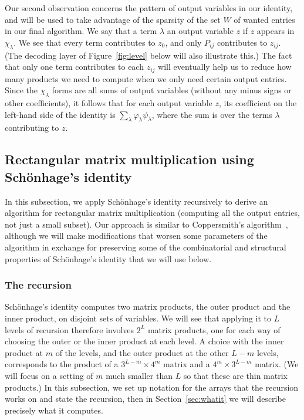 Our second observation concerns the pattern of output variables in our identity, and will be used to take advantage of the sparsity of the set $W$ of wanted entries in our final algorithm. 
We say that a term $\lambda$  an output variable $z$ if $z$ appears in $\chi_\lambda$. We see that every term contributes to $z_0$, and only $P_{ij}$ contributes to $z_{ij}$. (The decoding layer of Figure~\ref{fig:level} below will also illustrate this.) The fact that only one term contributes to each $z_{ij}$ will eventually help us to reduce how many products we need to compute when we only need certain output entries. Since the $\chi_\lambda$ forms are all sums of output variables (without any minus signs or other coefficients), it follows that for each output variable $z$, its coefficient on the left-hand side of the identity is $\sum_\lambda \varphi_\lambda\psi_\lambda$, where the sum is over the terms $\lambda$ contributing to $z$. 


\subsection{Rectangular matrix multiplication using Sch\"onhage's identity}\label{sec:full}

In this subsection, we apply Sch\"onhage's identity recursively to derive an algorithm for rectangular matrix multiplication (computing all the output entries, not just a small subset). Our approach is similar to Coppersmith's algorithm~\cite[``Proof version 2'']{Cop82}, although we will make modifications that worsen some parameters of the algorithm in exchange for preserving some of the combinatorial and structural properties of Sch\"onhage's identity that we will use below. 

\subsubsection{The recursion}\label{sec:recursion}

Sch\"onhage's identity computes two matrix products, the outer product and the inner product, on disjoint sets of variables. We will see that applying it to $L$ levels of recursion therefore involves $2^L$ matrix products, one for each way of choosing the outer or the inner product at each level. A choice with the inner product at $m$ of the levels, and the outer product at the other $L-m$ levels, corresponds to the product of a $3^{L-m}\times4^m$ matrix and a $4^m\times3^{L-m}$ matrix. (We will focus on a setting of $m$ much smaller than $L$ so that these are thin matrix products.) In this subsection, we set up notation for the arrays that the recursion works on and state the recursion, then in Section~\ref{sec:whatit} we will describe precisely what it computes.

